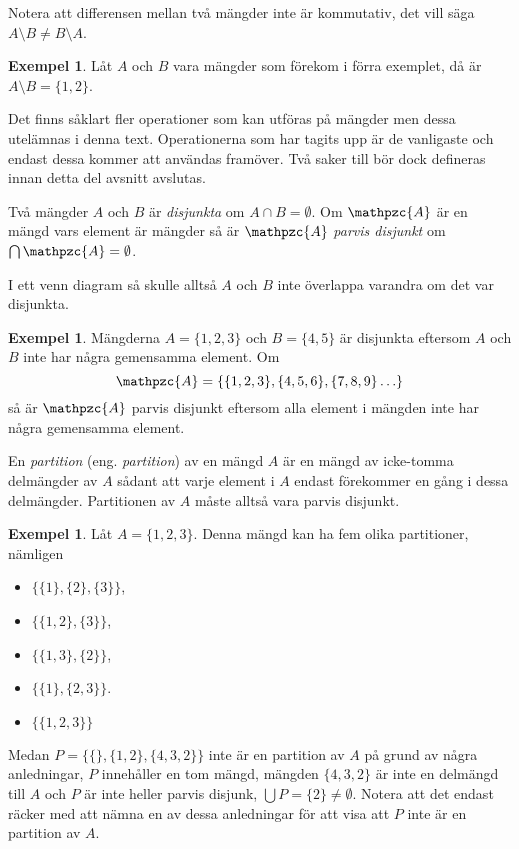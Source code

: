 \documentclass{article}
\theoremstyle{definition}
\newtheorem{exmp}[thm]{Exempel}
\begin{document}
Notera att differensen mellan två mängder inte är kommutativ, det vill säga 
$A \setminus B \neq B \setminus A$.
\begin{exmp}
  Låt $A$ och $B$ vara mängder som förekom i förra exemplet, då är $A \setminus B
  = \{1, 2\}$.  
\end{exmp}
Det finns såklart fler operationer som kan utföras på mängder men 
\linebreak
dessa utelämnas i denna 
text. 
Operationerna som har tagits upp är de vanligaste och endast dessa kommer 
att användas framöver. Två saker till bör dock defineras innan detta del avsnitt avslutas. 

\begin{mydef}{}{}
  Två mängder $A$ och $B$ är \textit{disjunkta} om $A \cap B = \emptyset$. Om $\mathpzc{A}$ är 
  en mängd vars element är mängder så är $\mathpzc{A}$ \textit{parvis disjunkt} om $\bigcap \mathpzc{A} = 
  \emptyset$.
\end{mydef}
I ett venn diagram så skulle alltså $A$ och $B$ inte överlappa varandra
om det var disjunkta. 
\begin{exmp}
  Mängderna $A = \{1, 2, 3\}$ och $B = \{4, 5\}$ 
  är disjunkta eftersom $A$ och $B$ inte har några gemensamma element. 
  Om 
  \[\mathpzc{A} = \{\{1, 2, 3\}, \{4, 5, 6\}, \{7, 8, 9\}\ldots\}\] 
  så är $\mathpzc{A}$ parvis disjunkt eftersom alla element i mängden 
  inte har några gemensamma element. 
\end{exmp}

\begin{mydef}{}{}
  En \textit{partition} (eng. \textit{partition}) av en mängd $A$ är en mängd av icke-tomma delmängder av $A$ sådant att 
  varje element i $A$ endast förekommer en gång i dessa delmängder. 
  Partitionen av $A$ måste alltså vara parvis disjunkt.
\end{mydef}
\begin{exmp}
  Låt $A = \{1, 2, 3\}$. Denna mängd kan ha fem olika partitioner, nämligen
\begin{itemize}
  \item $\{\{1\}, \{2\}, \{3\}\}$,
  \item $\{ \{1, 2\}, \{3\} \}$,
  \item $\{ \{1, 3\}, \{2\} \}$,
  \item $\{ \{1\}, \{2, 3\} \}$.
  \item $\{ \{1, 2, 3\} \}$
\end{itemize}
Medan $ P = \{ \{\}, \{1, 2\}, \{4, 3, 2\} \}$ inte är en partition av $A$ på grund av några anledningar, $P$ innehåller en tom mängd, mängden $\{4, 3, 2\}$ är inte en delmängd till $A$
och $P$ är inte heller parvis disjunk, $\bigcup P = \{2\} \neq \emptyset$. Notera att det endast räcker med att nämna en av dessa anledningar för att visa att $P$ inte är en partition av $A$.
\end{exmp}
\end{document}
